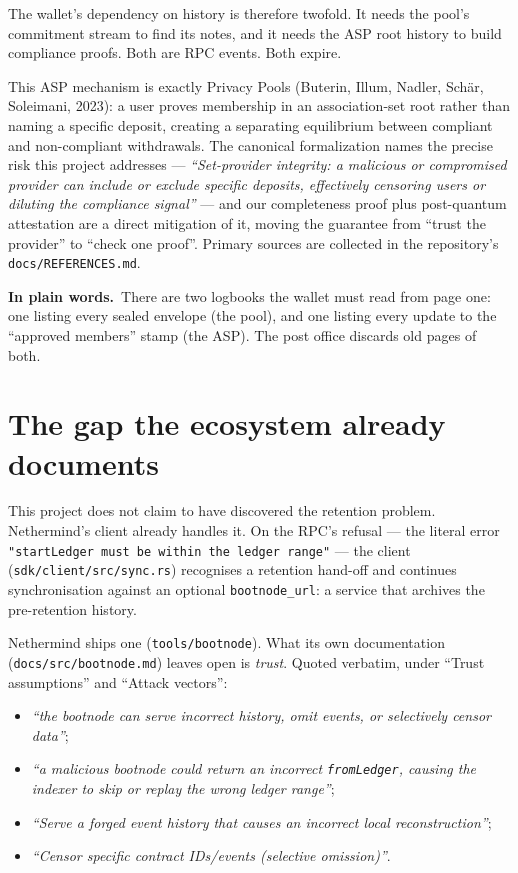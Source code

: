 \documentclass[11pt]{article}
\newcommand{\intuition}[1]{%
  \par\vspace{0.5em}%
  \noindent\colorbox{soft}{\parbox{\dimexpr\linewidth-2\fboxsep}{%
  \small\textbf{\color{klein}In plain words.}\ #1}}%
  \par\vspace{0.5em}%
}
\newcommand{\code}[1]{\texttt{\small #1}}
\begin{document}
The wallet's dependency on history is therefore twofold. It needs the pool's
commitment stream to find its notes, and it needs the ASP root history to build
compliance proofs. Both are RPC events. Both expire.

This ASP mechanism is exactly Privacy Pools (Buterin, Illum, Nadler, Schär,
Soleimani, 2023): a user proves membership in an association-set root rather than
naming a specific deposit, creating a separating equilibrium between compliant
and non-compliant withdrawals. The canonical formalization names the precise risk
this project addresses --- \emph{``Set-provider integrity: a malicious or
compromised provider can include or exclude specific deposits, effectively
censoring users or diluting the compliance signal''} --- and our completeness
proof plus post-quantum attestation are a direct mitigation of it, moving the
guarantee from ``trust the provider'' to ``check one proof''. Primary sources are
collected in the repository's \code{docs/REFERENCES.md}.

\intuition{There are two logbooks the wallet must read from page one: one listing
every sealed envelope (the pool), and one listing every update to the ``approved
members'' stamp (the ASP). The post office discards old pages of both.}

\section{The gap the ecosystem already documents}

This project does not claim to have discovered the retention problem. Nethermind's
client already handles it. On the RPC's refusal --- the literal error
\code{"startLedger must be within the ledger range"} --- the client
(\code{sdk/client/src/sync.rs}) recognises a retention hand-off and continues
synchronisation against an optional \code{bootnode\_url}: a service that archives
the pre-retention history.

Nethermind ships one (\code{tools/bootnode}). What its own documentation
(\code{docs/src/bootnode.md}) leaves open is \emph{trust}. Quoted verbatim, under
``Trust assumptions'' and ``Attack vectors'':

\begin{itemize}[leftmargin=1.4em]
\item \emph{``the bootnode can serve incorrect history, omit events, or
selectively censor data''};
\item \emph{``a malicious bootnode could return an incorrect \code{fromLedger},
causing the indexer to skip or replay the wrong ledger range''};
\item \emph{``Serve a forged event history that causes an incorrect local
reconstruction''};
\item \emph{``Censor specific contract IDs/events (selective omission)''}.
\end{itemize}
\end{document}
